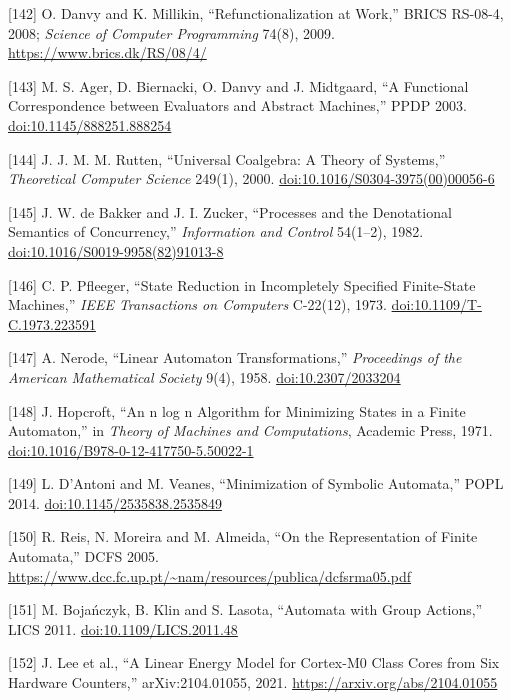 \documentclass[10pt,letterpaper]{article}
\begin{document}
{[}142{]} O. Danvy and K. Millikin, ``Refunctionalization at Work,''
BRICS RS-08-4, 2008; \emph{Science of Computer Programming} 74(8), 2009.
\url{https://www.brics.dk/RS/08/4/}

{[}143{]} M. S. Ager, D. Biernacki, O. Danvy and J. Midtgaard, ``A
Functional Correspondence between Evaluators and Abstract Machines,''
PPDP 2003.
\href{https://doi.org/10.1145/888251.888254}{doi:10.1145/888251.888254}

{[}144{]} J. J. M. M. Rutten, ``Universal Coalgebra: A Theory of
Systems,'' \emph{Theoretical Computer Science} 249(1), 2000.
\href{https://doi.org/10.1016/S0304-3975(00)00056-6}{doi:10.1016/S0304-3975(00)00056-6}

{[}145{]} J. W. de Bakker and J. I. Zucker, ``Processes and the
Denotational Semantics of Concurrency,'' \emph{Information and Control}
54(1--2), 1982.
\href{https://doi.org/10.1016/S0019-9958(82)91013-8}{doi:10.1016/S0019-9958(82)91013-8}

{[}146{]} C. P. Pfleeger, ``State Reduction in Incompletely Specified
Finite-State Machines,'' \emph{IEEE Transactions on Computers} C-22(12),
1973.
\href{https://doi.org/10.1109/T-C.1973.223591}{doi:10.1109/T-C.1973.223591}

{[}147{]} A. Nerode, ``Linear Automaton Transformations,''
\emph{Proceedings of the American Mathematical Society} 9(4), 1958.
\href{https://doi.org/10.2307/2033204}{doi:10.2307/2033204}

{[}148{]} J. Hopcroft, ``An n log n Algorithm for Minimizing States in a
Finite Automaton,'' in \emph{Theory of Machines and Computations},
Academic Press, 1971.
\href{https://doi.org/10.1016/B978-0-12-417750-5.50022-1}{doi:10.1016/B978-0-12-417750-5.50022-1}

{[}149{]} L. D'Antoni and M. Veanes, ``Minimization of Symbolic
Automata,'' POPL 2014.
\href{https://doi.org/10.1145/2535838.2535849}{doi:10.1145/2535838.2535849}

{[}150{]} R. Reis, N. Moreira and M. Almeida, ``On the Representation of
Finite Automata,'' DCFS 2005.
\url{https://www.dcc.fc.up.pt/~nam/resources/publica/dcfsrma05.pdf}

{[}151{]} M. Bojańczyk, B. Klin and S. Lasota, ``Automata with Group
Actions,'' LICS 2011.
\href{https://doi.org/10.1109/LICS.2011.48}{doi:10.1109/LICS.2011.48}

{[}152{]} J. Lee et al., ``A Linear Energy Model for Cortex-M0 Class
Cores from Six Hardware Counters,'' arXiv:2104.01055, 2021.
\url{https://arxiv.org/abs/2104.01055}
\end{document}
